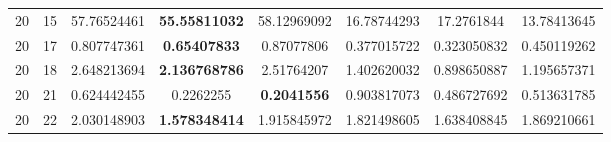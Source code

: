 \documentclass[runningheads]{llncs}
\begin{document}
\begin{table}[h]
{\begin{tabular}{|c|c||c|c|c||c|c|c|}
    20 & 15 & 57.76524461 & \textbf{55.55811032} & 58.12969092 & 16.78744293 & 17.2761844 & 13.78413645 \\
    20 & 17 & 0.807747361 & \textbf{0.65407833} & 0.87077806 & 0.377015722 & 0.323050832 & 0.450119262 \\
    20 & 18 & 2.648213694 & \textbf{2.136768786} & 2.51764207 & 1.402620032 & 0.898650887 & 1.195657371 \\
    20 & 21 & 0.624442455 & 0.2262255 & \textbf{0.2041556} & 0.903817073 & 0.486727692 & 0.513631785 \\
    20 & 22 & 2.030148903 & \textbf{1.578348414} & 1.915845972 & 1.821498605 & 1.638408845 & 1.869210661\\
    \hline
    \end{tabular}}
    \label{tab:my_label}
\end{table}
\hfill\break
\end{document}

